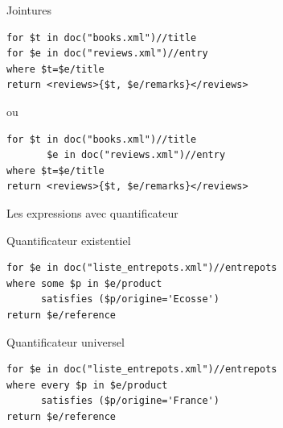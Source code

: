 \begin{frame}{Jointures}

\begin{lstlisting}
for $t in doc("books.xml")//title
for $e in doc("reviews.xml")//entry
where $t=$e/title
return <reviews>{$t, $e/remarks}</reviews>
\end{lstlisting}

ou 

\begin{lstlisting}
for $t in doc("books.xml")//title
	   $e in doc("reviews.xml")//entry
where $t=$e/title
return <reviews>{$t, $e/remarks}</reviews>
\end{lstlisting}


\end{frame}


\begin{frame}{Les expressions avec quantificateur}

Quantificateur existentiel
\begin{lstlisting}
for $e in doc("liste_entrepots.xml")//entrepots
where some $p in $e/product 
      satisfies ($p/origine='Ecosse')
return $e/reference
\end{lstlisting}

Quantificateur universel
\begin{lstlisting}
for $e in doc("liste_entrepots.xml")//entrepots
where every $p in $e/product 
      satisfies ($p/origine='France')
return $e/reference
\end{lstlisting}

\end{frame}


